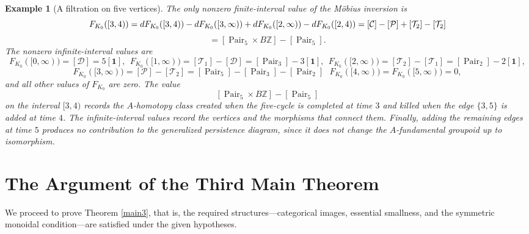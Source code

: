 \documentclass{amsart}
\newcommand{\Z}{\mathbb{Z}}
\newtheorem{example}[theorem]{Example}
\begin{document}
\begin{example}[A filtration on five vertices]
The only nonzero finite-interval value of the Möbius inversion is
\[
F_{K_0}([3,4))
=
dF_{K_0}([3,4))
-dF_{K_0}([3,\infty))
+dF_{K_0}([2,\infty))
-dF_{K_0}([2,4))\\
=
[\mathcal{C}]
-[\mathcal{P}]
+[\mathcal{T}_2]
-[\mathcal{T}_2]\]
\[=
[\operatorname{Pair}_5\times B\Z]
-
[\operatorname{Pair}_5].
\]
The nonzero infinite-interval values are
\[F_{K_0}([0,\infty))
=
[\mathcal{D}]
=
5[\mathbf{1}],\ \ 
F_{K_0}([1,\infty))
=
[\mathcal{T}_1]-[\mathcal{D}]
=
[\operatorname{Pair}_3]-3[\mathbf{1}], \  \  
F_{K_0}([2,\infty))
=
[\mathcal{T}_2]-[\mathcal{T}_1]
=
[\operatorname{Pair}_2]-2[\mathbf{1}],\]
\[F_{K_0}([3,\infty))
=
[\mathcal{P}]-[\mathcal{T}_2]
=
[\operatorname{Pair}_5]
-[\operatorname{Pair}_3]
-[\operatorname{Pair}_2] \ \ \
F_{K_0}([4,\infty))
=
F_{K_0}([5,\infty))
=
0,
\]
and all other values of \(F_{K_0}\) are zero. The value
\[
[\operatorname{Pair}_5\times B\Z]
-
[\operatorname{Pair}_5]
\]
on the interval \([3,4)\) records the \(A\)-homotopy class created when
the five-cycle is completed at time \(3\) and killed when the edge
\(\{3,5\}\) is added at time \(4\). The infinite-interval values record
the vertices and the morphisms that connect them. Finally, adding the
remaining edges at time \(5\) produces no contribution to the
generalized persistence diagram, since it does not change the
\(A\)-fundamental groupoid up to isomorphism.
\end{example}



\section{The Argument of the Third Main Theorem}\label{s6}

We proceed to prove Theorem \ref{main3}, that is,  the  required structures---categorical images, essential smallness, and the symmetric monoidal condition---are satisfied under the given hypotheses.

\end{document}
